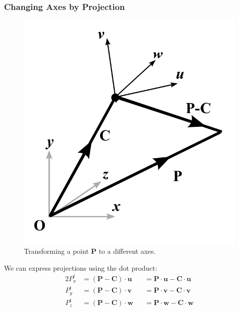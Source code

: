 \documentclass[11pt]{article}
\begin{document}
\subsubsection{Changing Axes by Projection}
\begin{figure}[htb!]
  \caption{Transforming a point $\textbf{P}$ to a different axes.}
  \includegraphics[scale=0.2]{changingaxes}
  \centering
\end{figure}

We can express projections using the dot product:
\begin{alignat*}{2}
  P_x^t &= (\textbf{P} - \textbf{C}) \cdot \textbf{u} &&= \textbf{P} \cdot \textbf{u} - \textbf{C} \cdot \textbf{u} \\
  P_y^t &= (\textbf{P} - \textbf{C}) \cdot \textbf{v} &&= \textbf{P} \cdot \textbf{v} - \textbf{C} \cdot \textbf{v} \\
  P_z^t &= (\textbf{P} - \textbf{C}) \cdot \textbf{w} &&= \textbf{P} \cdot \textbf{w} - \textbf{C} \cdot \textbf{w}
\end{alignat*}
\end{document}
